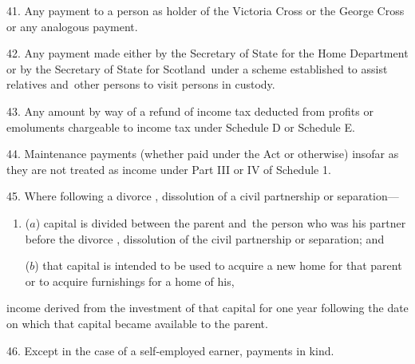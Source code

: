 \documentclass[12pt,a4paper]{article}
\begin{document}
\medskip

41.  Any payment to a person as holder of the Victoria Cross or the George Cross or any analogous payment.

\medskip

42.  Any payment made either by the Secretary of State for the Home Department or by the Secretary of State for Scotland~under a scheme established to assist relatives and~other persons to visit persons in custody.

\medskip

43.  Any amount by way of a refund of income tax deducted from profits or emoluments chargeable to income tax under Schedule D or Schedule E.

\medskip

44.  Maintenance payments (whether paid under the Act or otherwise) insofar as they are not treated as income under Part III or IV
of Schedule 1.  %


\medskip

45.  Where following a divorce%
, dissolution of a civil partnership  %
or separation—
\begin{enumerate}\item[]
($a$) capital is divided between the parent and~the person who was his partner before the divorce%
, dissolution of the civil partnership  %
or separation; and

($b$) that capital is intended to be used to acquire a new home for that parent or to acquire furnishings for a home of his,
\end{enumerate}
income derived from the investment of that capital for one year following the date on which that capital became available to the parent.


\medskip

46.  Except in the case of a self-employed earner, payments in kind.

\end{document}
